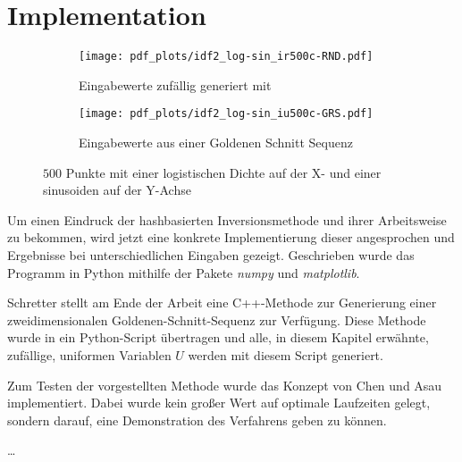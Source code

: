 \section{Implementation}
\label{impl}
\begin{figure*}[htb!]
    \centering
    \begin{subfigure}[b]{.3\textwidth}
        \centering
        \texttt{[image: pdf\_plots/idf2\_log-sin\_ir500c-RND.pdf]}
        \caption{Eingabewerte zufällig generiert mit }
        \label{fig:logsin_random}
    \end{subfigure}
    \hfill
    \begin{subfigure}[b]{.3\textwidth}
        \centering
        \texttt{[image: pdf\_plots/idf2\_log-sin\_iu500c-GRS.pdf]}
        \caption{Eingabewerte aus einer Goldenen Schnitt Sequenz}
        \label{fig:logsin_uniform}
    \end{subfigure}
    \caption{$500$ Punkte mit einer logistischen Dichte auf der X- und einer sinusoiden auf der Y-Achse}
    \label{fig:rand_vs_uniform}
\end{figure*}


Um einen Eindruck der hashbasierten Inversionsmethode und ihrer Arbeitsweise zu bekommen, 
wird jetzt eine konkrete Implementierung dieser angesprochen und Ergebnisse bei 
unterschiedlichen Eingaben gezeigt. Geschrieben wurde das Programm in Python mithilfe der 
Pakete \textit{numpy} und \textit{matplotlib}.

Schretter \cite{schretter-golden_ratio_sequences-2012} stellt am Ende der Arbeit eine 
C++-Methode zur Generierung einer zweidimensionalen Goldenen-Schnitt-Sequenz zur Verfügung. 
Diese Methode wurde in ein Python-Script übertragen und alle, in diesem Kapitel erwähnte, zufällige, uniformen
Variablen $U$ werden mit diesem Script generiert.

Zum Testen der vorgestellten Methode wurde das Konzept von Chen und Asau \cite{chen_asau-generating_random_variates-1974} 
implementiert. Dabei wurde kein großer Wert auf optimale Laufzeiten gelegt, sondern darauf, eine Demonstration 
des Verfahrens geben zu können.

\dots


